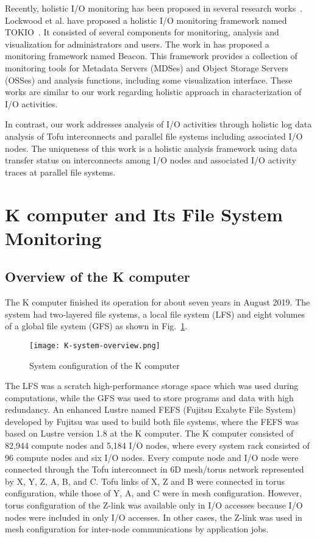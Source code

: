 \documentclass{jhps}
\begin{document}
Recently, holistic I/O monitoring has been proposed
in several research works~\cite{lockwood:cug18,yang:nsdi2019}.
Lockwood et al. have proposed a holistic I/O monitoring framework
named TOKIO~\cite{lockwood:cug18}.
It consisted of several components for monitoring, analysis and visualization
for administrators and users. The work in \cite{yang:nsdi2019} has proposed
a monitoring framework named Beacon.
This framework provides a collection of monitoring tools for Metadata Servers (MDSes)
and Object Storage Servers (OSSes) and analysis functions,
including some visualization interface. These works are similar to our work regarding
holistic approach in characterization of I/O activities.

In contrast, our work addresses analysis of I/O activities through holistic log data analysis
of Tofu interconnects and parallel file systems including associated I/O nodes.
The uniqueness of this work is a holistic analysis framework using data transfer status
on interconnects among I/O nodes and associated I/O activity traces at parallel file systems.


\section{K computer and Its File System Monitoring}\label{sec:K_OVERVIEW}
\label{sec:K_COMP}

\subsection{Overview of the K computer}

The K computer finished its operation for about seven years in August 2019.
The system had two-layered file systems, a local file system (LFS)
and eight volumes of a global file system (GFS) as shown in Fig.~\ref{fig:K_OVERVIEW}.
%
\begin{figure}[tb]
\centering
\texttt{[image: K-system-overview.png]}
\caption{System configuration of the K computer}
\label{fig:K_OVERVIEW}
\end{figure}
%
The LFS was a scratch high-performance storage space which was used during computations,
while the GFS was used to store programs and data with high redundancy.
An enhanced Lustre named FEFS (Fujitsu Exabyte File System)~\cite{fefs:fujitsu-tech-si}
developed by Fujitsu was used to build both file systems,
where the FEFS was based on Lustre version 1.8 at the K computer.
The K computer consisted of 82,944 compute nodes and 5,184 I/O nodes,
where every system rack consisted of 96 compute nodes and six I/O nodes.
Every compute node and I/O node were connected through the Tofu interconnect
in 6D mesh/torus network represented by X, Y, Z, A, B, and C.
Tofu links of X, Z and B were connected in torus configuration,
while those of Y, A, and C were in mesh configuration.
However, torus configuration of the Z-link was available only in I/O accesses
because I/O nodes were included in only I/O accesses.
In other cases, the Z-link was used in mesh configuration for inter-node communications
by application jobs.
\end{document}
